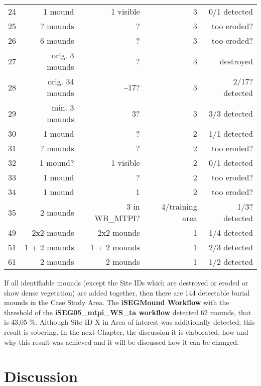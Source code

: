 \documentclass[
  12pt,
]{article}
\begin{document}
\begin{longtable}[]{@{}lrrrr@{}}
24 & 1 mound & 1 visible & 3 & 0/1 detected \\
25 & ? mounds & ? & 3 & too eroded? \\
26 & 6 mounds & ? & 3 & too eroded? \\
27 & orig. 3 mounds & ? & 3 & destroyed \\
28 & orig. 34 mounds & \textasciitilde17? & 3 & 2/17? detected \\
29 & min. 3 mounds & 3? & 3 & 3/3 detected \\
30 & 1 mound & ? & 2 & 1/1 detected \\
31 & ? mounds & ? & 2 & too eroded? \\
32 & 1 mound? & 1 visible & 2 & 0/1 detected \\
33 & 1 mound & ? & 2 & too eroded? \\
34 & 1 mound & 1 & 2 & too eroded? \\
35 & 2 mounds & 3 in WB\_MTPI? & 4/training area & 1/3? detected \\
49 & 2x2 mounds & 2x2 mounds & 1 & 1/4 detected \\
51 & 1 + 2 mounds & 1 + 2 mounds & 1 & 2/3 detected \\
61 & 2 mounds & 2 mounds & 1 & 1/2 detected \\
\bottomrule
\end{longtable}

If all identifiable mounds (except the Site IDs which are destroyed or eroded or show dense vegetation) are added together, then there are 144 detectable burial mounds in the Case Study Area. The \textbf{iSEGMound Workflow} with the threshold of the \textbf{iSEG05\_mtpi\_WS\_ta workflow} detected 62 mounds, that is 43,05 \%.
Although Site ID X in Area of interest was additionally detected, this result is sobering. In the next Chapter, the discussion it is elaborated, how and why this result was achieved and it will be discussed how it can be changed.

\newpage

\vspace{5mm}
\justifying

\hypertarget{discussion}{%
\section{Discussion}\label{discussion}}
\end{document}
